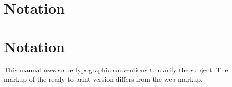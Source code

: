 
\ifhevea
  \let\thesectionoriginal\thesection
  \renewcommand{\thesection}{Frontmatter \Alph{section}}
  \section{\label{sec:notation}%
    Notation}
  \let\thesection\thesectionoriginal
\else
  \section*{\label{sec:notation}%
    Notation}
\fi

This manual uses some typographic conventions to clarify the subject.  The markup of the
ready-to-print version differs from the web markup.

